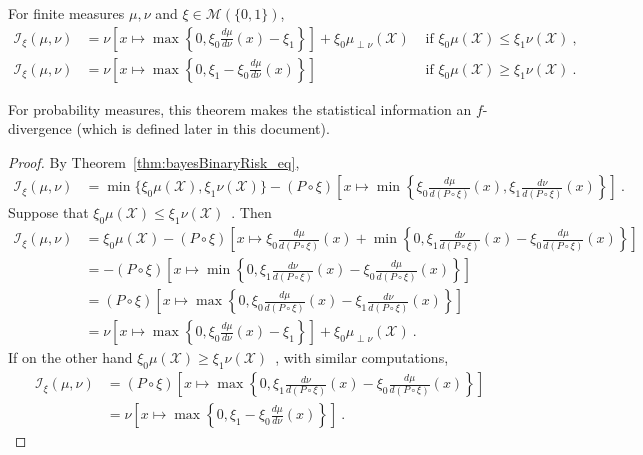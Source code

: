 \begin{theorem}
  \label{thm:statInfo_eq_integral}
  \leanok
  For finite measures $\mu, \nu$ and $\xi \in \mathcal M(\{0,1\})$,
  \begin{align*}
  \mathcal I_\xi(\mu, \nu)
  &= \nu\left[ x \mapsto \max \left\{0 , \xi_0\frac{d \mu}{d\nu}(x) - \xi_1 \right\} \right] + \xi_0 \mu_{\perp \nu}(\mathcal X) & \text{ if } \xi_0 \mu(\mathcal X) \le \xi_1 \nu(\mathcal X)
  \: , \\
  \mathcal I_\xi(\mu, \nu)
  &= \nu\left[ x \mapsto \max \left\{0 , \xi_1 - \xi_0\frac{d \mu}{d\nu}(x) \right\} \right] & \text{ if } \xi_0 \mu(\mathcal X) \ge \xi_1 \nu(\mathcal X)
  \: .
  \end{align*}
  
\end{theorem}

For probability measures, this theorem makes the statistical information an $f$-divergence (which is defined later in this document).

\begin{proof}\leanok
{}
By Theorem~\ref{thm:bayesBinaryRisk_eq},
\begin{align*}
\mathcal I_\xi(\mu, \nu)
&= \min\{\xi_0\mu(\mathcal X), \xi_1\nu(\mathcal X)\} - (P \circ \xi)\left[x \mapsto \min \left\{\xi_0\frac{d \mu}{d(P \circ \xi)}(x), \xi_1\frac{d \nu}{d(P \circ \xi)}(x)\right\}\right]
\: .
\end{align*}
Suppose that $\xi_0\mu(\mathcal X) \le \xi_1\nu(\mathcal X)$~. Then
\begin{align*}
\mathcal I_\xi(\mu, \nu)
&= \xi_0\mu(\mathcal X) - (P \circ \xi)\left[x \mapsto \xi_0\frac{d \mu}{d(P \circ \xi)}(x) + \min \left\{0 , \xi_1\frac{d \nu}{d(P \circ \xi)}(x) - \xi_0\frac{d \mu}{d(P \circ \xi)}(x)\right\}\right]
\\
&= - (P \circ \xi)\left[x \mapsto \min \left\{0 , \xi_1\frac{d \nu}{d(P \circ \xi)}(x) - \xi_0\frac{d \mu}{d(P \circ \xi)}(x) \right\}\right]
\\
&= (P \circ \xi)\left[x \mapsto \max \left\{0 , \xi_0\frac{d \mu}{d(P \circ \xi)}(x) - \xi_1\frac{d \nu}{d(P \circ \xi)}(x) \right\}\right]
\\
&= \nu\left[ x \mapsto \max \left\{0 , \xi_0\frac{d \mu}{d\nu}(x) - \xi_1 \right\} \right] + \xi_0 \mu_{\perp \nu}(\mathcal X)
\: .
\end{align*}
If on the other hand $\xi_0\mu(\mathcal X) \ge \xi_1\nu(\mathcal X)$~, with similar computations,
\begin{align*}
\mathcal I_\xi(\mu, \nu)
&= (P \circ \xi)\left[x \mapsto \max \left\{0 , \xi_1\frac{d \nu}{d(P \circ \xi)}(x) - \xi_0\frac{d \mu}{d(P \circ \xi)}(x) \right\}\right]
\\
&= \nu\left[ x \mapsto \max \left\{0 , \xi_1 - \xi_0\frac{d \mu}{d\nu}(x) \right\} \right]
\: .
\end{align*}
\end{proof}

